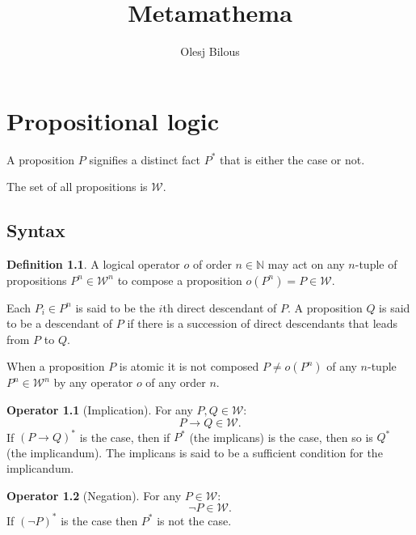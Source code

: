 \documentclass{amsbook}
\newcommand{\wffs}{\mathcal W}
\theoremstyle{definition}
\newtheorem{op}{Operator}[chapter]
\newtheorem{dfn}{Definition}[section]
\begin{document}
\title{Metamathema}
\author{Olesj Bilous}
\maketitle

\chapter{Propositional logic}

A proposition $P$ signifies a distinct fact $P^*$ that is either the case or not.

The set of all propositions is $\mathcal W$.

\section{Syntax}

\begin{dfn}
    A logical operator $o$ of order $n \in \mathbb N$ may act on any $n$-tuple of propositions $P^n \in \mathcal W^n$ to compose a proposition $o(P^n) = P \in \mathcal W$.

    Each $P_i \in P^n$ is said to be the $i$th direct descendant of $P$. A proposition $Q$ is said to be a descendant of $P$ if there is a succession of direct descendants that leads from $P$ to $Q$.

    When a proposition $P$ is atomic it is not composed $P \neq o(P^n)$ of any $n$-tuple $P^n \in \wffs^n$ by any operator $o$ of any order $n$.
\end{dfn}

\begin{op}[Implication]
    For any $P, Q \in \wffs$:
    $$
        P \rightarrow Q \in \wffs.
    $$
    If $(P \rightarrow Q)^*$ is the case, then if $P^*$ (the implicans) is the case, then so is $Q^*$ (the implicandum). The implicans is said to be a sufficient condition for the implicandum.
\end{op}

\begin{op}[Negation]
    For any $P \in \wffs$:
    $$
        \neg P \in \wffs.
    $$
    If $(\neg P)^*$ is the case then $P^*$ is not the case.
\end{op}
\end{document}
